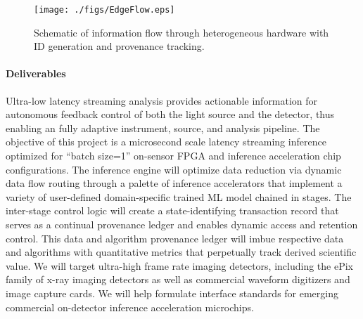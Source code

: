\documentclass{article}
\begin{document}
\begin{figure}
	\vspace{-1\baselineskip}
	\centerline{\texttt{[image: ./figs/EdgeFlow.eps]}}
	\vspace{-1\baselineskip}
	\caption{
		\label{fig::EdgeFlow}
		Schematic of information flow through heterogeneous hardware with ID generation and provenance tracking.
		}
	\vspace{-1\baselineskip}
\end{figure}

\paragraph{Deliverables}
Ultra-low latency streaming analysis provides actionable information for autonomous feedback control of both the light source and the detector, thus enabling an fully adaptive instrument, source, and analysis pipeline.
The objective of this project is a microsecond scale latency streaming inference optimized for ``batch size=1'' on-sensor FPGA and inference acceleration chip configurations.
The inference engine will optimize data reduction via dynamic data flow routing through a palette of inference accelerators that implement a variety of user-defined domain-specific trained ML model chained in stages. 
The inter-stage control logic will create a state-identifying transaction record that serves as a continual provenance ledger and enables dynamic access and retention control.
This data and algorithm provenance ledger will imbue respective data and algorithms with quantitative metrics that perpetually track derived scientific value.
We will target ultra-high frame rate imaging detectors, including the ePix family of x-ray imaging detectors as well as commercial waveform digitizers and image capture cards.
We will help formulate interface standards for emerging commercial on-detector inference acceleration microchips.

\break
\end{document}
